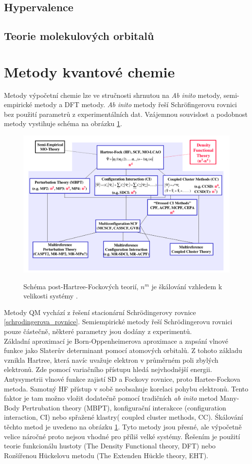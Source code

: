 \documentclass[
  digital, %
  table,   %
  lof,     %
  lot,     %
]{fithesis3}
\begin{document}
\subsection{Hypervalence}
\subsection{Teorie molekulových orbitalů}

\section{Metody kvantové chemie}
Metody výpočetní chemie lze ve stručnosti shrnutou na \textit{Ab inito} metody, semi-empirické metody a DFT metody. \textit{Ab inito} metody řeší Schröfingerovu rovnici bez použití parametrů z experimentálních dat.  Vzájemnou souvislost a podobnost metody vystihuje schéma na obrázku \ref{schema_QM}.
 \begin{figure}[h]
\caption{Schéma post-Hartree-Fockových teorií, $n^m$ je škálování vzhledem k velikosti systémy \cite{pdf_obrazek}. }
  \center
  \includegraphics[width=12cm]{schema_QM.png}
  \label{schema_QM}
  \end{figure}
  Metody QM vychází z řešení stacionární Schrödingerovy rovnice \ref{schrodingerova_rovnice}. Semiempirické metody řeší Schrödingerovu rovnici pouze částečně, některé parametry jsou dodány z experimentů. \\
     Základní aproximací je Born-Oppenheimerova aproximace a zapsání vlnové funkce jako Slaterův determinant pomocí atomových orbitalů. Z tohoto základu vznikla Hartree, která navíc uvažuje elektron v průměrném poli zbylých elektronů. Zde pomocí variačního přístupu hledá nejvhodnější energii. Antysymetrii vlnové funkce zajistí SD a Fockovy rovnice, proto Hartee-Fockova metoda. Samotný HF přístup v sobě neobsahuje korelaci pohybu elektronů. Tento faktor je tam možno vložit dodatečně pomocí tradičních \textit{ab inito} metod Many-Body Pertrubation  theory (MBPT), konfigurační interakcce (configuration interaction, CI) nebo spřažené klastry( coupled cluster methods, CC). Śkálování těchto metod je uvedeno na obrázku \ref{schema_QM}. Tyto metody jsou přesné, ale výpočetně velice náročné proto nejsou vhodné pro příliš velké systémy. Řešením je použití teorie funkcionálu hustoty (The Density Functional theory, DFT) nebo Rozšířenou Hückelovu metodu (The Extenden Hückle theory, EHT).
\end{document}
